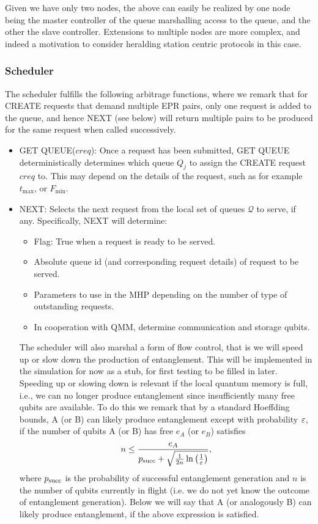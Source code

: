 \documentclass{article}
\begin{document}
Given we have only two nodes, the above can easily be realized by one node being the master controller of the queue marshalling access to the queue, and the other the slave controller. Extensions to multiple nodes are more complex, and indeed a motivation to consider heralding station centric protocols in this case.

\subsubsection{Scheduler}
The scheduler fulfills the
following arbitrage functions, where we remark that
for CREATE requests that demand multiple EPR pairs, only one request is added to the queue, and hence NEXT
(see below) will return multiple pairs
to be produced for the same request when called successively.
\begin{itemize}
\item GET QUEUE($creq$): Once a request has been submitted, GET QUEUE deterministically determines which queue $Q_j$ to
assign the CREATE request $creq$ to. This may depend
on the details of the request, such as for example $t_{\max}$, or $F_{\min}$.
\item NEXT: Selects the next request from the local set of queues $\mathcal{Q}$ to serve, if any. Specifically, NEXT will determine:
\begin{itemize}
\item Flag: True when a request is ready to be served.
\item Absolute queue id (and corresponding request details) of request to be served.
\item Parameters to use in the MHP depending on the number of type of outstanding requests.
\item In cooperation with QMM, determine communication and storage qubits.
\end{itemize}
The scheduler will also marshal a form of flow control, that is we will speed up or slow down the production of entanglement. This will be implemented in the simulation for now as a stub, for first testing to be filled in later. Speeding up or slowing down is relevant if the local quantum memory is full, i.e., we can no longer produce entanglement since insufficiently many free qubits are available.  To do this we remark that by a standard Hoeffding bounds, A (or B) can likely produce entanglement except with probability $\varepsilon$, if the number of qubits A (or B) has free $e_A$ (or $e_B$) satisfies
\begin{align}
n \leq \frac{e_A}{p_{\rm succ} + \sqrt{\frac{1}{2n} \ln\left(\frac{1}{\varepsilon}\right)}},
\end{align}
where $p_{\rm succ}$ is the probability of successful entanglement generation and $n$ is the number of qubits currently in flight (i.e. we do not yet
know the outcome of entanglement generation).
Below we will say that A (or analogously B) can likely produce entanglement, if the above expression is satisfied.
\end{itemize}
\end{document}

